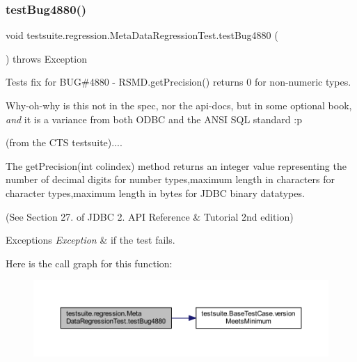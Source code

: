 \subsubsection{\texorpdfstring{test\+Bug4880()}{testBug4880()}}
{\footnotesize\ttfamily void testsuite.\+regression.\+Meta\+Data\+Regression\+Test.\+test\+Bug4880 (\begin{DoxyParamCaption}{ }\end{DoxyParamCaption}) throws Exception}

Tests fix for B\+UG\#4880 -\/ R\+S\+M\+D.\+get\+Precision() returns \textquotesingle{}0\textquotesingle{} for non-\/numeric types.

Why-\/oh-\/why is this not in the spec, nor the api-\/docs, but in some \textquotesingle{}optional\textquotesingle{} book, {\itshape and} it is a variance from both O\+D\+BC and the A\+N\+SI S\+QL standard \+:p

(from the C\+TS testsuite)....

The get\+Precision(int colindex) method returns an integer value representing the number of decimal digits for number types,maximum length in characters for character types,maximum length in bytes for J\+D\+BC binary datatypes.

(See Section 27. of J\+D\+BC 2. A\+PI Reference \& Tutorial 2nd edition)


\begin{DoxyExceptions}{Exceptions}
{\em Exception} & if the test fails. \\
\hline
\end{DoxyExceptions}
Here is the call graph for this function\+:
\nopagebreak
\begin{figure}[H]
\begin{center}
\leavevmode
\includegraphics[width=350pt]{classtestsuite_1_1regression_1_1_meta_data_regression_test_a5f79cbc323ee6b50a304811b962f4b37_cgraph}
\end{center}
\end{figure}
\mbox{\label{classtestsuite_1_1regression_1_1_meta_data_regression_test_a38cf409b423124090866e96e64226104}} 
